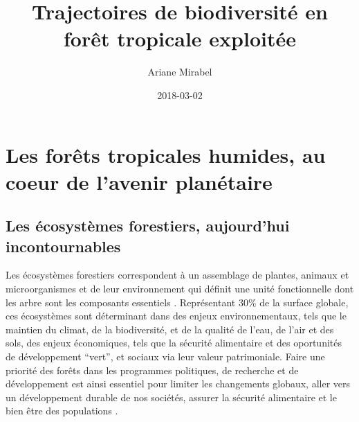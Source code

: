 \documentclass[
  11pt,
  french,
  A4paper,
  extrafontsizes,onecolumn,openright
  ]{memoir}
\title{Trajectoires de biodiversité en forêt tropicale exploitée}
\author{Ariane Mirabel}
\date{2018-03-02}
\begin{document}
\frontmatter



\makeflyleaf









\LargeMargins
{
\hypersetup{linkcolor=}
\setcounter{tocdepth}{3}
\tableofcontents
}



\LargeMargins
\mainmatter

\chapter{Les forêts tropicales humides, au coeur de l'avenir
planétaire}\label{les-forets-tropicales-humides-au-coeur-de-lavenir-planetaire}

\section{Les écosystèmes forestiers, aujourd'hui
incontournables}\label{les-ecosystemes-forestiers-aujourdhui-incontournables}

Les écosystèmes forestiers correspondent à un assemblage de plantes,
animaux et microorganismes et de leur environnement qui définit une
unité fonctionnelle dont les arbre sont les composants essentiels
\autocite{FRA2000}. Représentant 30\% de la surface globale, ces
écosystèmes sont déterminant dans des enjeux environnementaux, tels que
le maintien du climat, de la biodiversité, et de la qualité de l'eau, de
l'air et des sols, des enjeux économiques, tels que la sécurité
alimentaire et des oportunités de développement ``vert'', et sociaux via
leur valeur patrimoniale. Faire une priorité des forêts dans les
programmes politiques, de recherche et de développement est ainsi
essentiel pour limiter les changements globaux, aller vers un
développement durable de nos sociétés, assurer la sécurité alimentaire
et le bien être des populations \autocites{FRA2015}{Tilman2014}.
\end{document}
